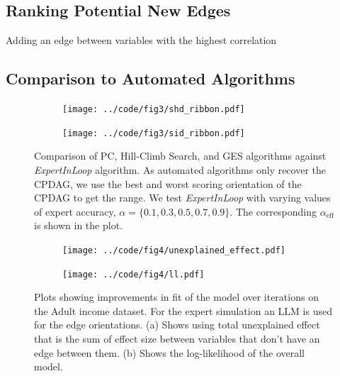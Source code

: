 \documentclass{uai2025} %
\begin{document}
\subsection{Ranking Potential New Edges}

\begin{algorithm}[h]
\DontPrintSemicolon
\SetAlgoLined
{}
\caption{Adding an edge between variables with the highest correlation}
\label{algo:ranked_expand}
\end{algorithm}

\subsection{Comparison to Automated Algorithms}
\begin{figure}[t!]
	\centering
	\begin{subfigure}{0.5\textwidth}
		\centering
		\texttt{[image: ../code/fig3/shd\_ribbon.pdf]}
		\caption{}
	\end{subfigure}
	\begin{subfigure}{0.5\textwidth}
		\centering
		\texttt{[image: ../code/fig3/sid\_ribbon.pdf]}
		\caption{}
	\end{subfigure}
	\caption{Comparison of PC, Hill-Climb Search, and GES algorithms against
		\emph{ExpertInLoop} algorithm. As automated algorithms only
		recover the CPDAG, we use the best and worst scoring
		orientation of the CPDAG to get the range. We test
		\emph{ExpertInLoop} with varying values of expert accuracy, $ \alpha = \{0.1, 0.3, 0.5, 0.7, 0.9\} $. The corresponding
		$\alpha_{\textrm{eff}} $ is shown in the plot.}
	\label{fig:shd_sid}
\end{figure}

\begin{figure}[t!]
	\begin{subfigure}{0.25\textwidth}
		\centering
		\texttt{[image: ../code/fig4/unexplained\_effect.pdf]}
		\caption{}
	\end{subfigure}%
	\begin{subfigure}{0.25\textwidth}
		\centering
		\texttt{[image: ../code/fig4/ll.pdf]}
		\caption{}
	\end{subfigure}
	\caption{Plots showing improvements in fit of the model over iterations
	on the Adult income dataset. For the expert simulation an LLM is used
	for the edge orientations. (a) Shows using total unexplained effect that is the
	sum of effect size between variables that don't have an edge between them. (b)
	Shows the log-likelihood of the overall model.
	}
	\label{fig:unexplained_ll}
\end{figure}
\end{document}

